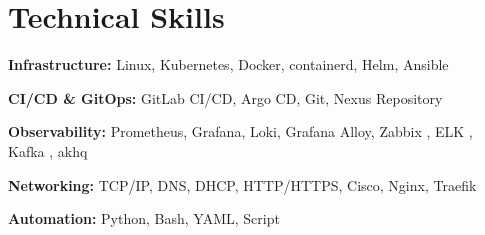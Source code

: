 \section{Technical Skills}

\textbf{Infrastructure:}
Linux, Kubernetes, Docker, containerd, Helm, Ansible

\textbf{CI/CD \& GitOps:}
GitLab CI/CD, Argo CD, Git, Nexus Repository

\textbf{Observability:}
Prometheus, Grafana, Loki, Grafana Alloy, Zabbix , ELK , Kafka , akhq

\textbf{Networking:}
TCP/IP, DNS, DHCP, HTTP/HTTPS, Cisco, Nginx, Traefik

\textbf{Automation:}
Python, Bash, YAML, Script
